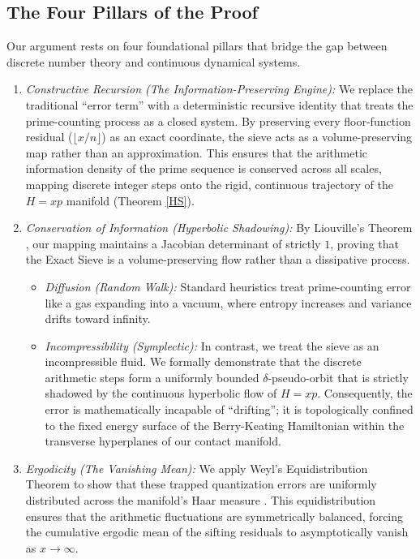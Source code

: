 \documentclass[sn-mathphys-num, pdflatex, referee]{sn-jnl}
\begin{document}
\subsection{The Four Pillars of the Proof}
Our argument rests on four foundational pillars that bridge the gap between discrete number theory and continuous dynamical systems.

\begin{enumerate}
    \item \textit{Constructive Recursion (The Information-Preserving Engine):} We replace the traditional ``error term'' with a deterministic recursive identity that treats the prime-counting process as a closed system. By preserving every floor-function residual ($\lfloor x/n \rfloor$) as an exact coordinate, the sieve acts as a volume-preserving map rather than an approximation. This ensures that the arithmetic information density of the prime sequence is conserved across all scales, mapping discrete integer steps onto the rigid, continuous trajectory of the $H=xp$ manifold (Theorem \ref{HS}).

    \item \textit{Conservation of Information (Hyperbolic Shadowing):} By Liouville's Theorem \cite{arnold1989}, our mapping maintains a Jacobian determinant of strictly $1$, proving that the Exact Sieve is a volume-preserving flow rather than a dissipative process.
    \begin{itemize}
        \item \textit{Diffusion (Random Walk):} Standard heuristics treat prime-counting error like a gas expanding into a vacuum, where entropy increases and variance drifts toward infinity.
        \item \textit{Incompressibility (Symplectic):} In contrast, we treat the sieve as an incompressible fluid. We formally demonstrate that the discrete arithmetic steps form a uniformly bounded $\delta$-pseudo-orbit that is strictly shadowed by the continuous hyperbolic flow of $H=xp$. Consequently, the error is mathematically incapable of ``drifting''; it is topologically confined to the fixed energy surface of the Berry-Keating Hamiltonian \cite{berry1999riemann} within the transverse hyperplanes of our contact manifold.
    \end{itemize}

    \item \textit{Ergodicity (The Vanishing Mean):} We apply Weyl's Equidistribution Theorem \cite{weyl} to show that these trapped quantization errors are uniformly distributed across the manifold's Haar measure \cite{halmos1950measure}. This equidistribution ensures that the arithmetic fluctuations are symmetrically balanced, forcing the cumulative ergodic mean of the sifting residuals to asymptotically vanish as $x \to \infty$.


\end{enumerate}
\end{document}
